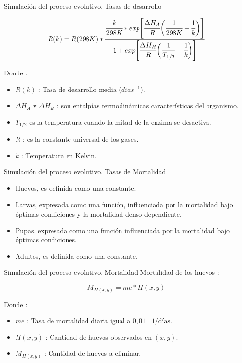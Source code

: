 \begin{frame}[c]{Simulación del proceso evolutivo. Tasas de desarrollo}
  \begin{center}
      \begin{equation} \label{eq:schoolfield}
         R(k)  = R(298K) *\cfrac{ \cfrac{k}{298K} *
          exp \Bigg[
                  \cfrac{\Delta H_{A}}{R} \bigg(\cfrac{1}{298K} - \cfrac{1}{k}\bigg)
              \Bigg]}
          {1 + exp\Bigg[\cfrac{\Delta H_{H}}{R} \bigg(\cfrac{1}{T_{1/2}}- \cfrac{1}{k}\bigg)\Bigg] }
      \end{equation}
  \end{center}
  Donde :
   \begin{itemize}
      \item $R(k)$ : Tasa de desarrollo media ($dias^{-1}$).
      \item $\Delta H_{A}$ y $\Delta H_{H}$ : son entalpías termodinámicas características del organismo.
      \item $T_{1/2}$ es la temperatura cuando la mitad de la enzima se desactiva.
      \item $R$ : es la constante universal de los gases.
      \item $k$ : Temperatura en Kelvin.
      \end{itemize}
\end{frame}

\begin{frame}[c]{Simulación del proceso evolutivo. Tasas de Mortalidad}
  \begin{itemize}
    \item Huevos, es definida como una constante.
    \item Larvas, expresada como una función, influenciada por la mortalidad bajo óptimas condiciones y la mortalidad denso dependiente.
    \item Pupas, expresada como una función influenciada por la mortalidad bajo óptimas condiciones.
    \item Adultos, es definida como una constante.
  \end{itemize}
\end{frame}

\begin{frame}[c]{Simulación del proceso evolutivo. Mortalidad}
  Mortalidad de los huevos :
  \begin{center}
      \begin{equation}
          M_{H(x,y)} = me * H(x,y)
      \end{equation}
  \end{center}
  Donde :
    \begin{itemize}
      \item $me$ : Tasa de mortalidad diaria igual a $0,01$ \ $1/\text{días}$.
      \item $H(x, y)$ : Cantidad de huevos observados en $(x,y)$.
      \item $M_{H(x,y)}$ : Cantidad de huevos a eliminar.
    \end{itemize}
\end{frame}

